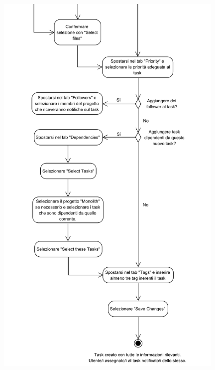 \begin{center}
	\includegraphics[width=11cm]{../../documenti/NormeDiProgetto/DiagrammiProcedure/CreazioneTask2.png}
\end{center}

